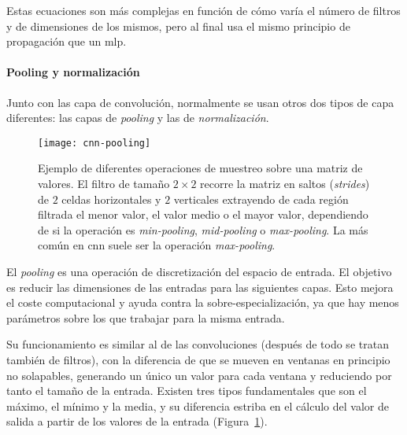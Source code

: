 Estas ecuaciones son más complejas en función de cómo varía el número de filtros y de dimensiones de los mismos, pero al final usa el mismo principio de propagación que un \acrshort{mlp}.

\paragraph{Pooling y normalización}

Junto con las capa de convolución, normalmente se usan otros dos tipos de capa diferentes: las capas de \textit{pooling} y las de \textit{normalización}.

\begin{figure}[!b]
	\centering
	\texttt{[image: cnn-pooling]}
	\caption[Diferentes operaciones de muestreo]{Ejemplo de diferentes operaciones de muestreo sobre una matriz de valores. El filtro de tamaño $2 \times 2$ recorre la matriz en saltos (\textit{strides}) de $2$ celdas horizontales y $2$ verticales extrayendo de cada región filtrada el menor valor, el valor medio o el mayor valor, dependiendo de si la operación es \textit{min-pooling}, \textit{mid-pooling} o \textit{max-pooling}. La más común en \acrshort{cnn} suele ser la operación \textit{max-pooling}.}
	\label{fig:cnn-max-pooling}
\end{figure}

El \textit{pooling} es una operación de discretización del espacio de entrada. El objetivo es reducir las dimensiones de las entradas para las siguientes capas. Esto mejora el coste computacional y ayuda contra la sobre-especialización, ya que hay menos parámetros sobre los que trabajar para la misma entrada.

Su funcionamiento es similar al de las convoluciones (después de todo se tratan también de filtros), con la diferencia de que se mueven en ventanas en principio no solapables, generando un único un valor para cada ventana y reduciendo por tanto el tamaño de la entrada. Existen tres tipos fundamentales que son el máximo, el mínimo y la media, y su diferencia estriba en el cálculo del valor de salida a partir de los valores de la entrada (Figura~\ref{fig:cnn-max-pooling}).

